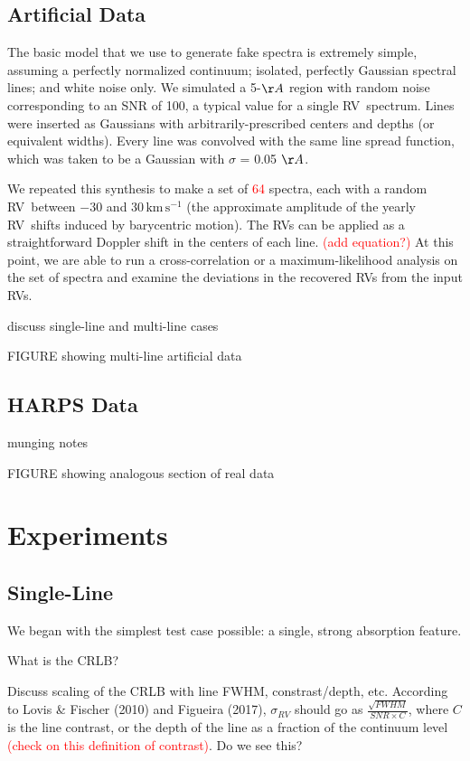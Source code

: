 \documentclass[modern]{aastex61}
\newcommand{\unit}[1]{\mathrm{#1}}
\newcommand{\km}{\unit{km}}
\newcommand{\s}{\unit{s}}
\newcommand{\kms}{\km\,\s^{-1}}
\newcommand{\todo}[1]{\textcolor{red}{#1}}  %
\newcommand{\acronym}[1]{{\small{#1}}}
\newcommand{\RV}{\acronym{RV}}
\begin{document}
\subsection{Artificial Data}

The basic model that we use to generate fake spectra is extremely simple, assuming a perfectly normalized continuum; isolated, perfectly Gaussian spectral lines; and white noise only. We simulated a 5-$\AA$ region with random noise corresponding to an SNR of 100, a typical value for a single \RV\ spectrum. Lines were inserted as Gaussians with arbitrarily-prescribed centers and depths (or equivalent widths). Every line was convolved with the same line spread function, which was taken to be a Gaussian with $\sigma$ = 0.05 $\AA$. %

We repeated this synthesis to make a set of \todo{64} spectra, each with a random \RV\ between $-30$ and $30\,\kms$ (the approximate amplitude of the yearly \RV\ shifts induced by barycentric motion). The \RV s can be applied as a straightforward Doppler shift in the centers of each line. \todo{(add equation?)} At this point, we are able to run a cross-correlation or a maximum-likelihood analysis on the set of spectra and examine the deviations in the recovered \RV s from the input \RV s.

discuss single-line and multi-line cases

FIGURE showing multi-line artificial data

\subsection{HARPS Data}

munging notes

FIGURE showing analogous section of real data

\section{Experiments}
\label{s:experiments}

\subsection{Single-Line}

We began with the simplest test case possible: a single, strong absorption feature.

What is the CRLB?

Discuss scaling of the CRLB with line FWHM, constrast/depth, etc. According to Lovis \& Fischer (2010) and Figueira (2017), $\sigma_{RV}$ should go as $\frac{\sqrt{FWHM}}{SNR \times C}$, where $C$ is the line contrast, or the depth of the line as a fraction of the continuum level \todo{(check on this definition of contrast)}. Do we see this?
\end{document}
